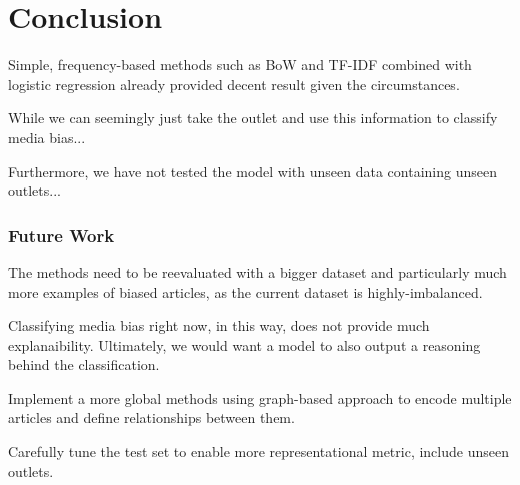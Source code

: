\chapter{Conclusion}
\label{cha:7}

Simple, frequency-based methods such as BoW and TF-IDF combined with logistic regression already provided decent result given the circumstances.

While we can seemingly just take the outlet and use this information to classify media bias...

Furthermore, we have not tested the model with unseen data containing unseen outlets...

\subsection{Future Work}

The methods need to be reevaluated with a bigger dataset and particularly much more examples of biased articles, as the current dataset is highly-imbalanced.

Classifying media bias right now, in this way, does not provide much explanaibility. Ultimately, we would want a model to also output a reasoning behind the classification.

Implement a more global methods using graph-based approach to encode multiple articles and define relationships between them.

Carefully tune the test set to enable more representational metric, include unseen outlets.

